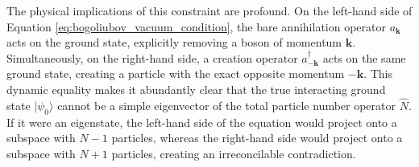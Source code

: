 The physical implications of this constraint are profound. On the left-hand side of Equation \ref{eq:bogoliubov_vacuum_condition}, the bare annihilation operator \( a_{\mathbf{k}} \) acts on the ground state, explicitly removing a boson of momentum \( \mathbf{k} \). Simultaneously, on the right-hand side, a creation operator \( a_{-\mathbf{k}}^\dagger \) acts on the same ground state, creating a particle with the exact opposite momentum \( -\mathbf{k} \). This dynamic equality makes it abundantly clear that the true interacting ground state \( |\psi_0\rangle \) cannot be a simple eigenvector of the total particle number operator \( \hat{N} \). If it were an eigenstate, the left-hand side of the equation would project onto a subspace with \( N - 1 \) particles, whereas the right-hand side would project onto a subspace with \( N + 1 \) particles, creating an irreconcilable contradiction.

